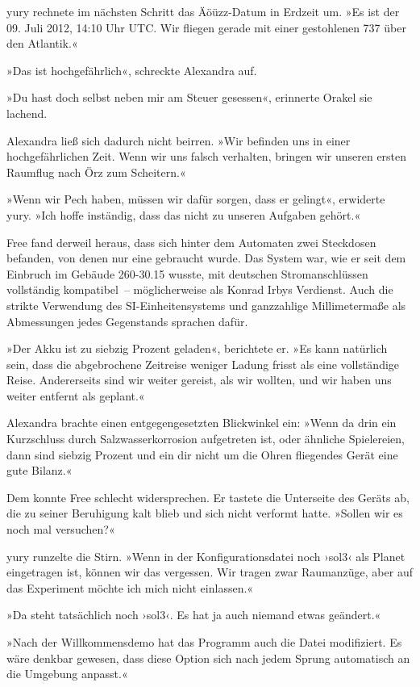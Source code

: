yury rechnete im nächsten Schritt das Äöüzz-Datum in Erdzeit um. »Es ist der 09. Juli 2012, 14:10 Uhr UTC. Wir fliegen gerade mit einer gestohlenen 737 über den Atlantik.«

»Das ist hochgefährlich«, schreckte Alexandra auf.

»Du hast doch selbst neben mir am Steuer gesessen«, erinnerte Orakel sie lachend.

Alexandra ließ sich dadurch nicht beirren. »Wir befinden uns in einer hochgefährlichen Zeit. Wenn wir uns falsch verhalten, bringen wir unseren ersten Raumflug nach Örz zum Scheitern.«

»Wenn wir Pech haben, müssen wir dafür sorgen, dass er gelingt«, erwiderte yury. »Ich hoffe inständig, dass das nicht zu unseren Aufgaben gehört.«

Free fand derweil heraus, dass sich hinter dem Automaten zwei Steckdosen befanden, von denen nur eine gebraucht wurde. Das System war, wie er seit dem Einbruch im Gebäude 260-30.15 wusste, mit deutschen Stromanschlüssen vollständig kompatibel~– möglicherweise als Konrad Irbys Verdienst. Auch die strikte Verwendung des SI-Einheitensystems und ganzzahlige Millimetermaße als Abmessungen jedes Gegenstands sprachen dafür.

»Der Akku ist zu siebzig Prozent geladen«, berichtete er. »Es kann natürlich sein, dass die abgebrochene Zeitreise weniger Ladung frisst als eine vollständige Reise. Andererseits sind wir weiter gereist, als wir wollten, und wir haben uns weiter entfernt als geplant.«

Alexandra brachte einen entgegengesetzten Blickwinkel ein: »Wenn da drin ein Kurzschluss durch Salzwasserkorrosion aufgetreten ist, oder ähnliche Spielereien, dann sind siebzig Prozent und ein dir nicht um die Ohren fliegendes Gerät eine gute Bilanz.«

Dem konnte Free schlecht widersprechen. Er tastete die Unterseite des Geräts ab, die zu seiner Beruhigung kalt blieb und sich nicht verformt hatte. »Sollen wir es noch mal versuchen?«

yury runzelte die Stirn. »Wenn in der Konfigurationsdatei noch ›sol3‹ als Planet eingetragen ist, können wir das vergessen. Wir tragen zwar Raumanzüge, aber auf das Experiment möchte ich mich nicht einlassen.«

»Da steht tatsächlich noch ›sol3‹. Es hat ja auch niemand etwas geändert.«

»Nach der Willkommensdemo hat das Programm auch die Datei modifiziert. Es wäre denkbar gewesen, dass diese Option sich nach jedem Sprung automatisch an die Umgebung anpasst.«

